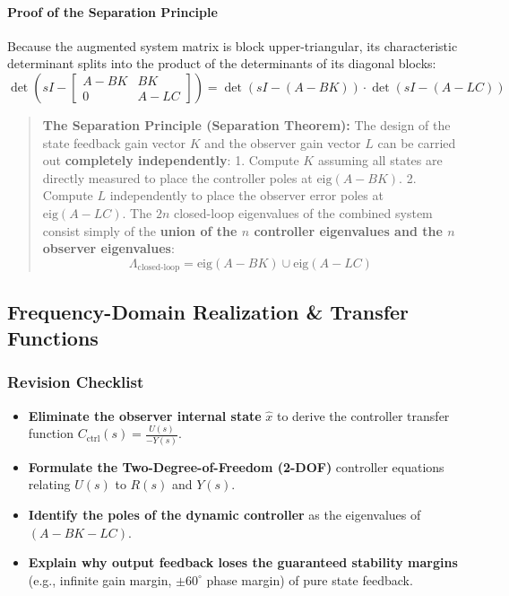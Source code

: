 \documentclass[12pt,onecolumn,twoside ]{article}
\begin{document}
	\paragraph{Proof of the Separation Principle}
	Because the augmented system matrix is block upper-triangular, its characteristic determinant splits into the product of the determinants of its diagonal blocks: \[
	\det \left( sI - \begin{bmatrix} A - BK & BK \\ 0 & A - LC \end{bmatrix} \right) = \det(sI - (A - BK)) \cdot \det(sI - (A - LC))
	\]
	\begin{quote}
		\textbf{The Separation Principle (Separation Theorem):} The design of the state feedback gain vector $K$ and the observer gain vector $L$ can be carried out \textbf{completely independently}:  1. Compute $K$ assuming all states are directly measured to place the controller poles at $\text{eig}(A - BK)$. 2. Compute $L$ independently to place the observer error poles at $\text{eig}(A - LC)$.  The $2n$ closed-loop eigenvalues of the combined system consist simply of the \textbf{union of the $n$ controller eigenvalues and the $n$ observer eigenvalues}: \[
		\Lambda_{\text{closed-loop}} = \text{eig}(A - BK) \cup \text{eig}(A - LC)
		\]
	\end{quote}
	
	\subsection{Frequency-Domain Realization \& Transfer Functions}
	\subsubsection{Revision Checklist}
	\begin{itemize}
		\item[$\square$]
		\textbf{Eliminate the observer internal state} $\hat{x}$ to derive the controller transfer function $C_{\text{ctrl}}(s) = \frac{U(s)}{-Y(s)}$.
		\item[$\square$]
		\textbf{Formulate the Two-Degree-of-Freedom (2-DOF)} controller equations relating $U(s)$ to $R(s)$ and $Y(s)$.
		\item[$\square$]
		\textbf{Identify the poles of the dynamic controller} as the eigenvalues of $(A - BK - LC)$.
		\item[$\square$]
		\textbf{Explain why output feedback loses the guaranteed stability margins} (e.g., infinite gain margin, $\pm 60^\circ$ phase margin) of pure state feedback.
	\end{itemize}
	
\end{document}
